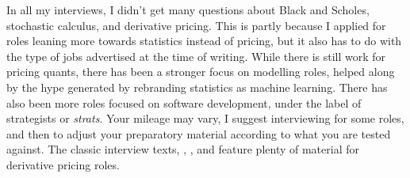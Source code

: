\documentclass[11pt]{article}
\begin{document}
In all my interviews, I didn't get many questions about Black and Scholes, stochastic calculus, and derivative pricing.
This is partly because I applied for roles leaning more towards statistics instead of pricing, but it also has to do with the type of jobs advertised at the time of writing.
While there is still work for pricing quants, there has been a stronger focus on modelling roles, helped along by the hype generated by rebranding statistics as machine learning.
There has also been more roles focused on software development, under the label of strategists or \emph{strats}.
Your mileage may vary, I suggest interviewing for some roles, and then to adjust your preparatory material according to what you are tested against.
The classic interview texts,
\cite{HeardOnTheStreet},
\cite{WilmottFAQ}, and
\citet{JoshiQA}
feature plenty of material for derivative pricing roles.





\end{document}
